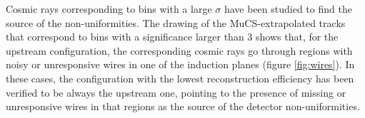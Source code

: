 \documentclass[a4paper,11pt]{article}
\begin{document}
%

 Cosmic rays corresponding to bins with a large $\sigma$ have been studied to find the source of the non-uniformities. The drawing of the MuCS-extrapolated tracks that correspond to bins with a significance larger than 3 shows that, for the upstream configuration, the corresponding cosmic rays go through regions with noisy or unresponsive wires in one of the induction planes (figure \ref{fig:wires}). In these cases, the configuration with the lowest reconstruction efficiency has been verified to be always the upstream one, pointing to the presence of missing or unresponsive wires in that regions as the source of the detector non-uniformities.
\end{document}
